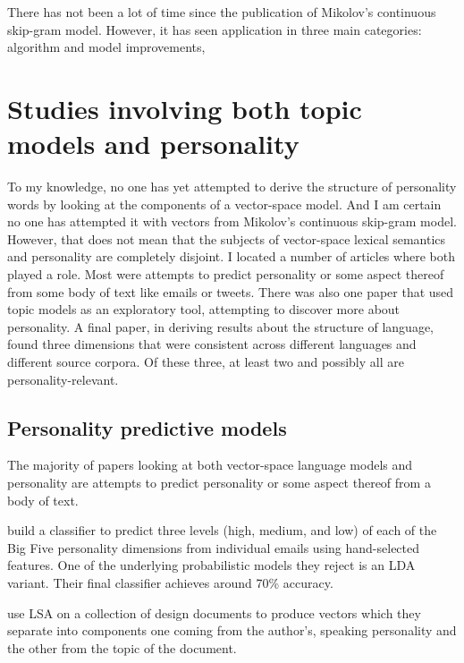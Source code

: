 \documentclass[eric_thesis.tex]{subfiles}
\begin{document}
There has not been a lot of time since the publication of Mikolov's continuous
skip-gram model. However, it has seen application in three main categories:
algorithm and model improvements, 

\citep{Mikolov2013c}

\section{Studies involving both topic models and personality}

To my knowledge, no one has yet attempted to derive the structure of personality
words by looking at the components of a vector-space model. And 
I am certain no one
has attempted it with vectors from Mikolov's continuous skip-gram model. 
However, that does not
mean that the subjects of vector-space lexical semantics and personality are
completely disjoint. I located a number of articles where both played a role.
Most were attempts to predict personality or some aspect thereof from some body 
of text like emails or tweets. There was also one paper that used topic
models as an exploratory tool, attempting to discover more about personality.
A final paper, in deriving results about the structure of language,
found three dimensions that were consistent across different
languages and different source corpora. Of these three, at least two and 
possibly all are personality-relevant.

\subsection{Personality predictive models}

The majority of papers looking at both vector-space language models and 
personality are attempts to predict personality or some aspect thereof from a 
body of text.

 build a classifier to predict three levels
(high, medium, and low) of each of the Big Five personality dimensions from
individual emails using hand-selected features. One of the underlying 
probabilistic models they reject is an LDA variant. Their final classifier
achieves around 70\% accuracy.

 use LSA on a collection of design documents
to produce vectors which they separate into components one coming from 
the author's, speaking personality and the other from the topic of the document.
\end{document}
